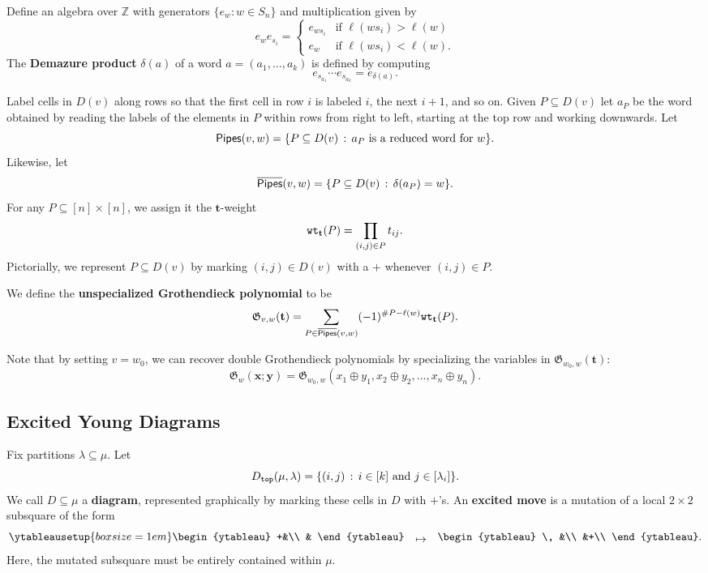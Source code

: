 \documentclass[12pt]{amsart}
\theoremstyle{definition}
\theoremstyle{remark}
\numberwithin{equation}{section}
\newcommand\mydef[1]{{\bf #1}}
\newcommand{\dem}{\delta}
\newcommand{\Pipes}{{\sf Pipes}}
\newcommand{\KPipes}{\overline{\sf Pipes}}
\newcommand{\wt}{{\tt wt}}
\begin{document}
Define an algebra over $\mathbb Z$ with generators $\{e_w:w\in S_n\}$ and multiplication given by
\[e_we_{s_i}=
\begin{cases}
e_{ws_i} &\text{if } \ell(ws_i)>\ell(w) \\
e_w & \text{if } \ell(ws_i)<\ell(w).
\end{cases}\]
The \mydef{Demazure product} $\dem(a)$ of a word $a=(a_1,\ldots,a_k)$ is defined by computing \[e_{s_{a_1}}\cdots e_{s_{a_k}}=e_{\dem(a)}.\]






Label cells in $D(v)$ along rows so that the first cell in row $i$
 is labeled $i$, the next $i+1$, and so on.
 Given $P\subseteq D(v)$ let $a_P$ be the word obtained by reading the labels of the elements in $P$  within rows from right to left, starting at the top row and working downwards. 
 Let \[\Pipes(v,w)=\{P\subseteq D(v)\,:  \,a_P \text{ is a reduced word for } w\}.\]  Likewise, let \[\KPipes(v,w)=\{P\subseteq D(v)\,:  \,\dem(a_P)=w\}.\]
 For any $P\subseteq [n]\times [n]$, we assign it the $\mathbf t$-weight \[\wt_{\mathbf t}(P)=\prod_{(i,j)\in P}t_{ij}.\]
 Pictorially, we represent $P\subseteq D(v)$ by marking $(i,j)\in D(v)$ with a $+$ whenever $(i,j)\in P$.

 We define the \mydef{unspecialized Grothendieck polynomial} to be 
 \begin{equation}
 \label{eq:unspecgroth}
     \mathfrak G_{v,w}(\mathbf t)=\sum_{P\in\KPipes(v,w)}(-1)^{\#P-\ell(w)}\wt_{\mathbf t}(P).
 \end{equation}


Note that by setting $v=w_0$, we can recover double Grothendieck polynomials by specializing the variables in $\mathfrak G_{w_0,w}(\mathbf t)$:
\[\mathfrak G_w(\mathbf x;\mathbf y)=\mathfrak G        _{w_0,w}(x_1\oplus y_1,x_2\oplus y_2,\dots,x_n\oplus y_n).\]



\subsection{Excited Young Diagrams}\label{sec:EYD}
Fix partitions $\lambda\subseteq \mu$.  Let \[D_{\tt top}(\mu,\lambda)=\{(i,j)\,:  \, i\in[k] \text{ and } j\in [\lambda_i]\}.\] 
We call $D\subseteq \mu$ a \mydef{diagram}, represented graphically by marking these cells in $D$ with $+$'s.
An \mydef{excited move} is a mutation of a local $2\times 2$ subsquare of the form
\begin{equation}\label{eq:EYDsimple}
    \ytableausetup{boxsize=1em}
\begin{ytableau}
+&\\
&
\end{ytableau}
\hspace{1em}
 \raisebox{-.2em}{$\mapsto$}
 \hspace{1em}
\begin{ytableau}
\, &\\
&+\\
\end{ytableau}.
\end{equation}
 Here, the mutated subsquare must be entirely contained within $\mu$.
\end{document}
